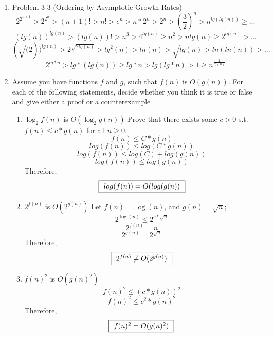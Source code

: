 \documentclass[11pt]{article}
\begin{document}
\begin{enumerate}
\item Problem 3-3 (Ordering by Asymptotic Growth Rates)
\[ 2^{2^{n+1}} > 2^{2^{n}} > (n+1)! > n! > e^{n} > n*2^{n} > 2^{n} > (\frac{3}{2})^{n} > n^{lg(lg(n))} \geq ... \]
\[ (lg(n))^{lg(n)} > (lg(n))! > n^{3} > 4^{lg(n)} \geq n^{2} > nlg(n) \geq 2^{lg(n)} > ... \]
\[ (\sqrt(2))^{lg(n)} > 2^{\sqrt{2lg(n)}} > lg^2(n) > ln(n) > \sqrt{lg(n)} > ln(ln(n)) > ... \]
\[ 2^{lg*n} > lg*(lg(n)) \geq lg*n > lg(lg*n) > 1 \geq n^{\frac{1}{lg(n)}}\]

\item Assume you have functions $f$ and $g$, such that $f(n)$ is $O(g(n))$.  For each of the following statements, decide whether you think it is true or false and give either a proof or a counterexample

\begin{enumerate}
\item $\log_{2} f(n)$ is $O(\log_{2} g(n))$
\newline
Prove that there exists some $c > 0$ s.t. $f(n) \leq c*g(n)$ for all $n \geq 0$.
\[ f(n) \leq C*g(n) \]
\[ log(f(n)) \leq log(C*g(n)) \]
\[ log(f(n)) \leq log(C) + log(g(n)) \]
\[ log(f(n)) \leq log(g(n)) \]
Therefore; 
\[ \fbox{\textbf{ $log(f(n)) = O(log(g(n))$ }} \]


\item $2^{f(n)}$ is $O(2^{g(n)})$
\newline 
Let $f(n) = \log(n)$, and $g(n) = \sqrt{n}$;
\[ 2^{\log(n)} \leq 2^{c * \sqrt{n}} \]
\[ 2^{f(n)} = n \]
\[ 2^{g(n)} = 2^{\sqrt{n}} \]
Therefore; 
\[ \fbox{\textbf{ $2^{f(n)} \neq O(2^{g(n)})$ }} \]


\item $f(n)^{2}$ is $O(g(n)^{2})$
\[ f(n)^{2} \leq (c*g(n))^{2} \]
\[ f(n)^{2} \leq c^2 * g(n)^2 \]
Therefore, 
\[ \fbox{\textbf{ $f(n)^2 = O(g(n)^2)$ }} \]


\end{enumerate}

\end{enumerate}
\end{document}
